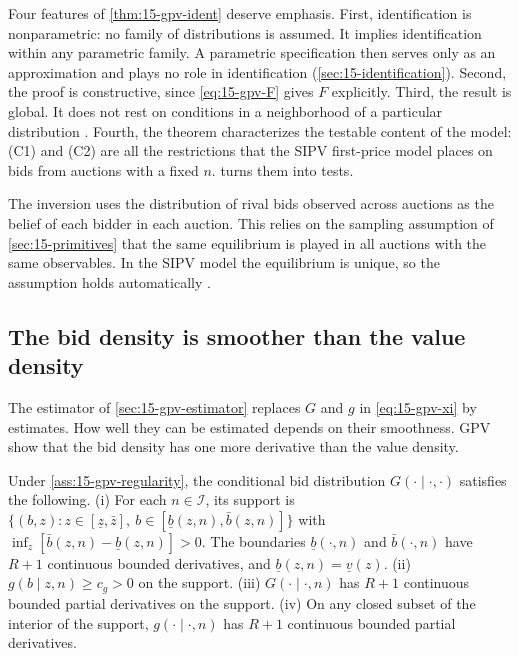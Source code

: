 \begin{remark}\label{rem:15-gpv-ident-kind}
Four features of \cref{thm:15-gpv-ident} deserve emphasis. First, identification is nonparametric: no family of distributions is assumed. It implies identification within any parametric family. A parametric specification then serves only as an approximation and plays no role in identification (\cref{sec:15-identification}). Second, the proof is constructive, since \eqref{eq:15-gpv-F} gives $F$ explicitly. Third, the result is global. It does not rest on conditions in a neighborhood of a particular distribution \citep[footnote 7]{GuerrePerrigneVuong2000}. Fourth, the theorem characterizes the testable content of the model: (C1) and (C2) are all the restrictions that the SIPV first-price model places on bids from auctions with a fixed $n$.  turns them into tests.
\end{remark}

\begin{remark}\label{rem:15-gpv-same-eq}
The inversion uses the distribution of rival bids observed across auctions as the belief of each bidder in each auction. This relies on the sampling assumption of \cref{sec:15-primitives} that the same equilibrium is played in all auctions with the same observables. In the SIPV model the equilibrium is unique, so the assumption holds automatically \citep[Section 3.1]{AtheyHaile2007}.
\end{remark}

\subsection{The bid density is smoother than the value density}\label{sec:15-gpv-smooth}

The estimator of \cref{sec:15-gpv-estimator} replaces $G$ and $g$ in \eqref{eq:15-gpv-xi} by estimates. How well they can be estimated depends on their smoothness. GPV show that the bid density has one more derivative than the value density.

\begin{proposition}\label{prop:15-gpv-smooth}
Under \cref{ass:15-gpv-regularity}, the conditional bid distribution $G(\cdot\mid\cdot,\cdot)$ satisfies the following.
(i) For each $n\in\mathcal I$, its support is $\{(b,z):z\in[\underline z,\bar z],\ b\in[\underline b(z,n),\bar b(z,n)]\}$ with $\inf_z[\bar b(z,n)-\underline b(z,n)]>0$. The boundaries $\underline b(\cdot,n)$ and $\bar b(\cdot,n)$ have $R+1$ continuous bounded derivatives, and $\underline b(z,n)=\underline v(z)$.
(ii) $g(b\mid z,n)\ge c_g>0$ on the support.
(iii) $G(\cdot\mid\cdot,n)$ has $R+1$ continuous bounded partial derivatives on the support.
(iv) On any closed subset of the interior of the support, $g(\cdot\mid\cdot,n)$ has $R+1$ continuous bounded partial derivatives.
\end{proposition}

